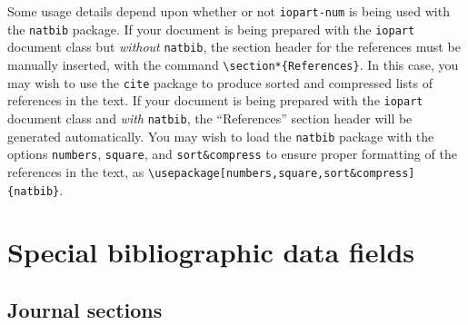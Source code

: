 \documentclass[12pt]{iopart}
\begin{document}
Some usage details depend upon whether or not \texttt{iopart-num} is
being used with the \texttt{natbib} package.  If your document is
being prepared with the \texttt{iopart} document class but
\textit{without} \texttt{natbib}, the section header for the
references must be manually inserted, with the command
\verb+\section*{References}+.  In this case, you may wish to use the
\texttt{cite} package to produce sorted and compressed lists of
references in the text.  If your document is being prepared with the
\texttt{iopart} document class and \textit{with} \texttt{natbib}, the
``References'' section header will be generated automatically.  You
may wish to load the \texttt{natbib} package with the options
\verb+numbers+, \verb+square+, and \verb+sort&compress+ to ensure
proper formatting of the references in the text, as
\verb+\usepackage[numbers,square,sort&compress]{natbib}+.

\section{Special bibliographic data fields}

\subsection{Journal sections}
\end{document}
